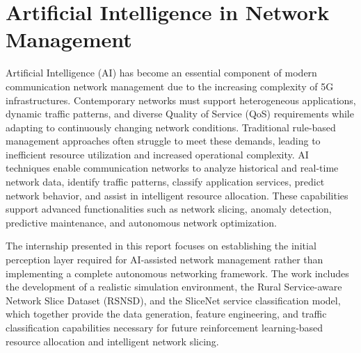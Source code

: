 \documentclass[12pt,a4paper]{report}
\begin{document}
	\section{Artificial Intelligence in Network Management}
	\label{sec:ai}
	
Artificial Intelligence (AI) has become an essential component of modern communication network management due to the increasing complexity of 5G infrastructures. Contemporary networks must support heterogeneous applications, dynamic traffic patterns, and diverse Quality of Service (QoS) requirements while adapting to continuously changing network conditions. Traditional rule-based management approaches often struggle to meet these demands, leading to inefficient resource utilization and increased operational complexity. AI techniques enable communication networks to analyze historical and real-time network data, identify traffic patterns, classify application services, predict network behavior, and assist in intelligent resource allocation. These capabilities support advanced functionalities such as network slicing, anomaly detection, predictive maintenance, and autonomous network optimization.

The internship presented in this report focuses on establishing the initial perception layer required for AI-assisted network management rather than implementing a complete autonomous networking framework. The work includes the development of a realistic simulation environment, the Rural Service-aware Network Slice Dataset (RSNSD), and the SliceNet service classification model, which together provide the data generation, feature engineering, and traffic classification capabilities necessary for future reinforcement learning-based resource allocation and intelligent network slicing.

	

	
\end{document}
